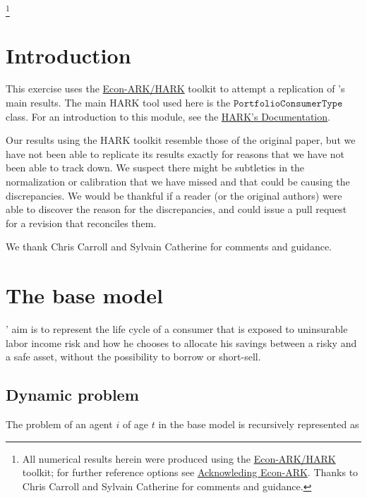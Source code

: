 \documentclass[./CGMPortfolio.tex]{subfiles}
\begin{document}
\thanks{All numerical results herein were produced using the \href{https://econ-ark/HARK}{Econ-ARK/HARK} toolkit; for further reference options see \href{https://econ-ark.org/acknowledging/}{Acknowleding Econ-ARK}.  Thanks to Chris Carroll and Sylvain Catherine for comments and guidance.}

\titlepagefinish

\newtheorem{defn}{Definition}
\newtheorem{theorem}{Theorem}

\hypertarget{Introduction}{}
\section{Introduction}

This exercise uses the \href{https://github.com/econ-ark/hark}{Econ-ARK/HARK} 
toolkit to attempt a replication of \cite{cgm2015}'s main results. The main 
HARK tool used 
here is the $\texttt{PortfolioConsumerType}$ 
class. For an introduction to this module, see the 
\href{https://hark.readthedocs.io/en/latest/}{HARK's 
	Documentation}.

Our results using the HARK toolkit resemble those of the original paper, but we 
have not been able to replicate its results exactly for reasons that we have 
not been able to track down. We suspect there might be subtleties in the 
normalization or calibration that we have missed and that could be causing the 
discrepancies. We would be thankful if a reader (or the original authors) were 
able to discover the reason for the discrepancies, and could issue a pull 
request for a revision that reconciles them.

We thank Chris Carroll and Sylvain Catherine for comments and guidance.

\hypertarget{The-base-model}{}
\section{The base model}

\cite{cgm2015}' aim is to represent the life cycle of a consumer that is 
exposed to uninsurable labor income risk and how he chooses to allocate his 
savings between a risky and a safe asset, without the possibility to borrow or 
short-sell.

\subsection{Dynamic problem}

The problem of an agent $i$ of age $t$ in the base model is recursively represented as
\end{document}
